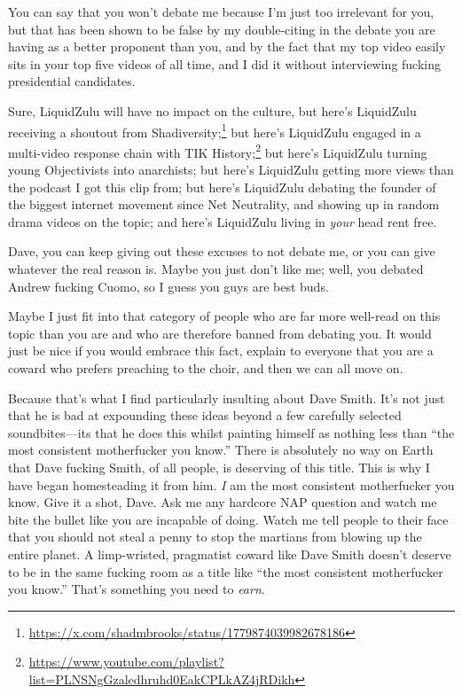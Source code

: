 \documentclass[11pt]{article}
\begin{document}
You can say that you won't debate me because I'm just too irrelevant for you, but that has been shown to be false by my double-citing in the debate you are having as a better proponent than you, and by the fact that my top video easily sits in your top five videos of all time, and I did it without interviewing fucking presidential candidates.

Sure, LiquidZulu will have no impact on the culture, but here's LiquidZulu receiving a shoutout from Shadiversity;\footnote{\url{https://x.com/shadmbrooks/status/1779874039982678186}} but here's LiquidZulu engaged in a multi-video response chain with TIK History;\footnote{\url{https://www.youtube.com/playlist?list=PLNSNgGzaledhruhd0EakCPLkAZ4jRDikh}} but here's LiquidZulu turning young Objectivists into anarchists; but here's LiquidZulu getting more views than the podcast I got this clip from; but here's LiquidZulu debating the founder of the biggest internet movement since Net Neutrality, and showing up in random drama videos on the topic; and here's LiquidZulu living in \emph{your} head rent free.

Dave, you can keep giving out these excuses to not debate me, or you can give whatever the real reason is. Maybe you just don't like me; well, you debated Andrew fucking Cuomo, so I guess you guys are best buds.

Maybe I just fit into that category of people who are far more well-read on this topic than you are and who are therefore banned from debating you. It would just be nice if you would embrace this fact, explain to everyone that you are a coward who prefers preaching to the choir, and then we can all move on.

Because that's what I find particularly insulting about Dave Smith. It's not just that he is bad at expounding these ideas beyond a few carefully selected soundbites---its that he does this whilst painting himself as nothing less than ``the most consistent motherfucker you know.'' There is absolutely no way on Earth that Dave fucking Smith, of all people, is deserving of this title. This is why I have began homesteading it from him. \emph{I} am the most consistent motherfucker you know. Give it a shot, Dave. Ask me any hardcore NAP question and watch me bite the bullet like you are incapable of doing. Watch me tell people to their face that you should not steal a penny to stop the martians from blowing up the entire planet. A limp-wristed, pragmatist coward like Dave Smith doesn't deserve to be in the same fucking room as a title like ``the most consistent motherfucker you know.'' That's something you need to \emph{earn}.
\end{document}
